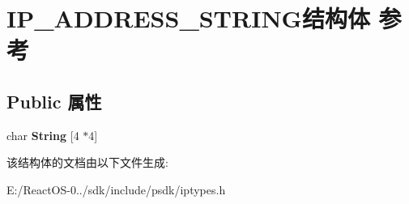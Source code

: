 \hypertarget{struct_i_p___a_d_d_r_e_s_s___s_t_r_i_n_g}{}\section{I\+P\+\_\+\+A\+D\+D\+R\+E\+S\+S\+\_\+\+S\+T\+R\+I\+N\+G结构体 参考}
\label{struct_i_p___a_d_d_r_e_s_s___s_t_r_i_n_g}
\subsection*{Public 属性}
\begin{DoxyCompactItemize}
\item 
\mbox{\label{struct_i_p___a_d_d_r_e_s_s___s_t_r_i_n_g_aac83fde15f1f4144fc45b827f979fdb5}} 
char {\bfseries String} \mbox{[}4 $\ast$4\mbox{]}
\end{DoxyCompactItemize}


该结构体的文档由以下文件生成\+:\begin{DoxyCompactItemize}
\item 
E\+:/\+React\+O\+S-\/0../sdk/include/psdk/iptypes.\+h\end{DoxyCompactItemize}
